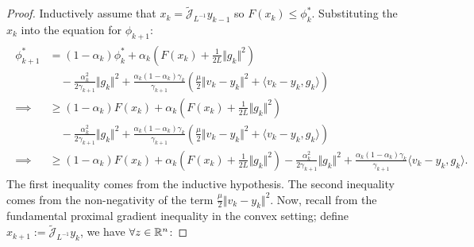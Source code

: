 \documentclass[12pt]{article}
\begin{document}
    \begin{proof}
        Inductively assume that $x_k = \widetilde{\mathcal J}_{L^{-1}}y_{k - 1}$ so $F(x_k) \le \phi_k^*$. 
        Substituting the $x_k$ into the equation for $\phi_{k + 1}$: 
        {\small
        \begin{align}
            \begin{split}
                \phi_{k + 1}^* &= 
                (1 - \alpha_k) \phi_k^*
                + 
                \alpha_k
                \left(
                    F(x_k) + \frac{1}{2L}\Vert g_k\Vert^2
                \right)
                \\&\quad 
                    - \frac{\alpha_k^2}{2\gamma_{k + 1}}\Vert g_k\Vert^2
                    + \frac{\alpha_k (1 - \alpha_k)\gamma_k}{\gamma_{k + 1}}
                    \left(
                        \frac{\mu}{2}\Vert v_k - y_k\Vert^2 + \langle v_k - y_k, g_k\rangle
                    \right)
                \\
                \implies 
                &\ge 
                (1 - \alpha_k)F(x_k)
                + 
                \alpha_k
                \left(
                    F(x_k) + \frac{1}{2L}\Vert g_k\Vert^2
                \right)
                \\&\quad
                    - \frac{\alpha_k^2}{2\gamma_{k + 1}}\Vert g_k\Vert^2
                    + \frac{\alpha_k (1 - \alpha_k)\gamma_k}{\gamma_{k + 1}}
                    \left(
                        \frac{\mu}{2}\Vert v_k - y_k\Vert^2 + \langle v_k - y_k, g_k\rangle
                    \right)
                \\
                \implies
                &\ge 
                (1 - \alpha_k)F(x_k)
                + 
                \alpha_k
                \left(
                    F(x_k) + \frac{1}{2L}\Vert g_k\Vert^2
                \right)
                - \frac{\alpha_k^2}{2\gamma_{k + 1}}\Vert g_k\Vert^2
                + 
                \frac{\alpha_k (1 - \alpha_k)\gamma_k}{\gamma_{k + 1}}
                \langle v_k - y_k, g_k\rangle. 
            \end{split}
            \label{app:acc-prox-grad-ineq1}
        \end{align}
        }
        The first inequality comes from the inductive hypothesis. 
        The second inequality comes from the non-negativity of the term $\frac{\mu}{2}\Vert v_k - y_k\Vert^2$. 
        Now, recall from the fundamental proximal gradient inequality in the convex setting; define $x_{k + 1} := \widetilde{\mathcal J}_{L^{-1}}y_k$, we have $\forall z\in \mathbb R^n$: 

\end{proof}
\end{document}

